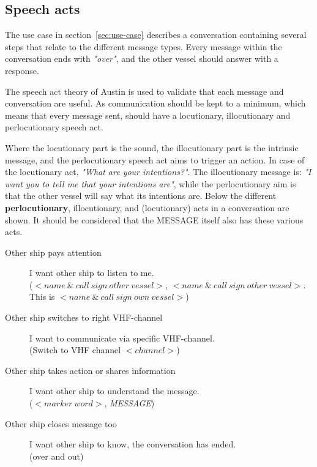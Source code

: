 \subsection{Speech acts}
The use case in section~\ref{sec:use-case} describes a conversation containing several steps that relate to the different message types. Every message within the conversation ends with \emph{"over"}, and the other vessel should answer with a response.

The speech act theory of Austin \cite{Austin1975} is used to validate that each message and conversation are useful. As communication should be kept to a minimum, which means that every message sent, should have a locutionary, illocutionary and perlocutionary speech act.

Where the locutionary part is the sound, the illocutionary part is the intrinsic message, and the perlocutionary speech act aims to trigger an action. In case of the locutionary act, \emph{"What are your intentions?"}. The illocutionary message is: \emph{"I want you to tell me that your intentions are"}, while the perlocutionary aim is that the other vessel will say what its intentions are.
Below the different \textbf{perlocutionary}, illocutionary, and (locutionary) acts in a conversation are shown. It should be considered that the MESSAGE itself also has these various acts.

\begin{description}
	\item[Other ship pays attention] I want other ship to listen to me.\\ ($<name~\&~call~sign~other~vessel>$, $<name~\&~call~sign~other~vessel>$. This is $<name~\&~call~sign~own~vessel>$)
	\item[Other ship switches to right VHF-channel] I want to communicate via specific VHF-channel.\\ (Switch to VHF channel $<channel>$)
	\item[Other ship takes action or shares information] I want other ship to understand the message.\\ ($<marker~word>$, \emph{MESSAGE})
	\item[Other ship closes message too] I want other ship to know, the conversation has ended.\\ (over and out)
\end{description}

